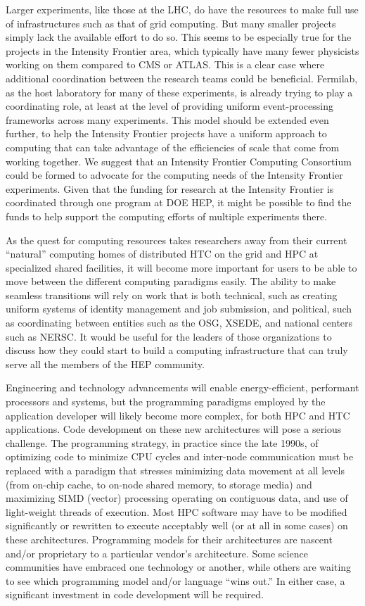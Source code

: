Larger experiments, like those at the LHC, do have the resources to make full use of infrastructures such as that of grid computing.  But many smaller projects simply lack the available effort to do so.  This seems to be especially true for the projects in the Intensity Frontier area, which typically have many fewer physicists working on them compared to CMS or ATLAS.  This is a clear case where additional coordination between the research teams could be beneficial.  Fermilab, as the host laboratory for many of these experiments, is already trying to play a coordinating role, at least at the level of providing uniform event-processing frameworks across many experiments.  This model should be extended even further, to help the Intensity Frontier projects have a uniform approach to computing that can take advantage of the efficiencies of scale that come from working together.  We suggest that an Intensity Frontier Computing Consortium could be formed to advocate for the computing needs of the Intensity Frontier experiments.  Given that the funding for research at the Intensity Frontier is coordinated through one program at DOE HEP, it might be possible to find the funds to help support the computing efforts of multiple experiments there.

As the quest for computing resources takes researchers away from their current ``natural'' computing homes of distributed HTC on the grid and HPC at specialized shared facilities, it will become more important for users to be able to move between the different computing paradigms easily.  The ability to make seamless transitions will rely on work that is both technical, such as creating uniform systems of identity management and job submission, and political, such as coordinating between entities such as the OSG, XSEDE, and national centers such as NERSC.  It would be useful for the leaders of those organizations to discuss how they could start to build a computing infrastructure that can truly serve all the members of the HEP community.


Engineering and technology advancements will enable energy-efficient, performant processors and systems, but the 
programming paradigms employed by the application developer will likely become more complex, for both HPC and HTC 
applications.   
Code development on these new architectures will pose a serious challenge. 
The programming strategy, in practice since the late 1990s, of optimizing code to minimize CPU cycles and 
inter-node communication must be replaced with a paradigm that stresses minimizing data movement at all levels 
(from on-chip cache, to on-node shared memory, to storage media) and maximizing SIMD (vector) 
processing operating on contiguous data, and use of light-weight threads of execution. 
Most HPC software may have to be modified significantly or rewritten to execute acceptably well 
(or at all in some cases) on these architectures. Programming models for their architectures are 
nascent and/or proprietary to a particular vendor's architecture. Some science communities have 
embraced one technology or another, while others are waiting to see which programming model 
and/or language ``wins out.'' In either case, a significant investment in code development will be required.
 
